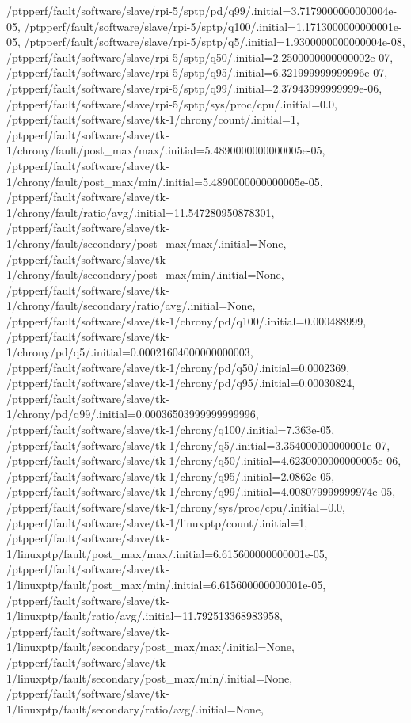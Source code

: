 {    /ptpperf/fault/software/slave/rpi-5/sptp/pd/q99/.initial=3.7179000000000004e-05,
    /ptpperf/fault/software/slave/rpi-5/sptp/q100/.initial=1.1713000000000001e-05,
    /ptpperf/fault/software/slave/rpi-5/sptp/q5/.initial=1.9300000000000004e-08,
    /ptpperf/fault/software/slave/rpi-5/sptp/q50/.initial=2.2500000000000002e-07,
    /ptpperf/fault/software/slave/rpi-5/sptp/q95/.initial=6.321999999999996e-07,
    /ptpperf/fault/software/slave/rpi-5/sptp/q99/.initial=2.37943999999999e-06,
    /ptpperf/fault/software/slave/rpi-5/sptp/sys/proc/cpu/.initial=0.0,
    /ptpperf/fault/software/slave/tk-1/chrony/count/.initial=1,
    /ptpperf/fault/software/slave/tk-1/chrony/fault/post_max/max/.initial=5.4890000000000005e-05,
    /ptpperf/fault/software/slave/tk-1/chrony/fault/post_max/min/.initial=5.4890000000000005e-05,
    /ptpperf/fault/software/slave/tk-1/chrony/fault/ratio/avg/.initial=11.547280950878301,
    /ptpperf/fault/software/slave/tk-1/chrony/fault/secondary/post_max/max/.initial=None,
    /ptpperf/fault/software/slave/tk-1/chrony/fault/secondary/post_max/min/.initial=None,
    /ptpperf/fault/software/slave/tk-1/chrony/fault/secondary/ratio/avg/.initial=None,
    /ptpperf/fault/software/slave/tk-1/chrony/pd/q100/.initial=0.000488999,
    /ptpperf/fault/software/slave/tk-1/chrony/pd/q5/.initial=0.00021604000000000003,
    /ptpperf/fault/software/slave/tk-1/chrony/pd/q50/.initial=0.0002369,
    /ptpperf/fault/software/slave/tk-1/chrony/pd/q95/.initial=0.00030824,
    /ptpperf/fault/software/slave/tk-1/chrony/pd/q99/.initial=0.00036503999999999996,
    /ptpperf/fault/software/slave/tk-1/chrony/q100/.initial=7.363e-05,
    /ptpperf/fault/software/slave/tk-1/chrony/q5/.initial=3.354000000000001e-07,
    /ptpperf/fault/software/slave/tk-1/chrony/q50/.initial=4.6230000000000005e-06,
    /ptpperf/fault/software/slave/tk-1/chrony/q95/.initial=2.0862e-05,
    /ptpperf/fault/software/slave/tk-1/chrony/q99/.initial=4.008079999999974e-05,
    /ptpperf/fault/software/slave/tk-1/chrony/sys/proc/cpu/.initial=0.0,
    /ptpperf/fault/software/slave/tk-1/linuxptp/count/.initial=1,
    /ptpperf/fault/software/slave/tk-1/linuxptp/fault/post_max/max/.initial=6.615600000000001e-05,
    /ptpperf/fault/software/slave/tk-1/linuxptp/fault/post_max/min/.initial=6.615600000000001e-05,
    /ptpperf/fault/software/slave/tk-1/linuxptp/fault/ratio/avg/.initial=11.792513368983958,
    /ptpperf/fault/software/slave/tk-1/linuxptp/fault/secondary/post_max/max/.initial=None,
    /ptpperf/fault/software/slave/tk-1/linuxptp/fault/secondary/post_max/min/.initial=None,
    /ptpperf/fault/software/slave/tk-1/linuxptp/fault/secondary/ratio/avg/.initial=None,
}
